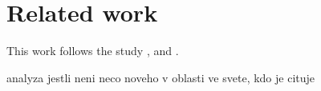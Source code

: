 \chapter{Related work}
\label{chapters:related-work}

This work follows the study \cite{necasky2012conceptual}, \cite{xcase} and \cite{exolutio}.

analyza jestli neni neco noveho v oblasti ve svete, kdo je cituje